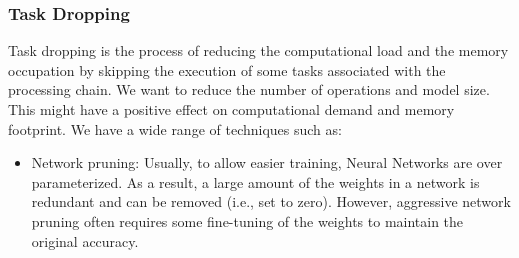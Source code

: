\documentclass{article}
\begin{document}
      \subsubsection{Task Dropping}
        Task dropping is the process of reducing the computational load and the memory occupation by skipping the execution of some tasks associated with the processing chain. We want to reduce the number of operations and model size. This might have
        a positive effect on computational demand and memory footprint. We have a wide range of techniques such as:
        \begin{itemize}
          \item Network pruning: Usually, to allow easier training, Neural Networks are over parameterized. As a result, a large amount of the weights in a network is redundant
          and can be removed (i.e., set to zero). However, aggressive network pruning often requires some fine-tuning of the weights to maintain the original accuracy.


\end{itemize}
\end{document}
